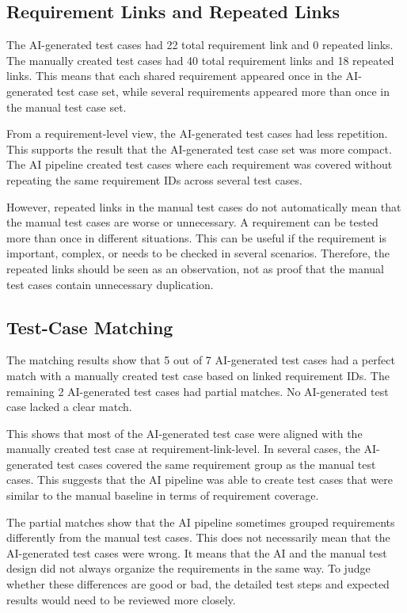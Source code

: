 \documentclass[a4paper,12pt]{article}
\begin{document}
\subsection{Requirement Links and Repeated Links}
The AI-generated test cases had 22 total requirement link and 0 repeated links. The manually created test cases had 40 total requirement links and 18 repeated links. This means that each shared requirement appeared once in the AI-generated test case set, while several requirements appeared more than once in the manual test case set.

From a requirement-level view, the AI-generated test cases had less repetition. This supports the result that the AI-generated test case set was more compact. The AI pipeline created test cases where each requirement was covered without repeating the same requirement IDs across several test cases. 

However, repeated links in the manual test cases do not automatically mean that the manual test cases are worse or unnecessary. A requirement can be tested more than once in different situations. This can be useful if the requirement is important, complex, or needs to be checked in several scenarios. Therefore, the repeated links should be seen as an observation, not as proof that the manual test cases contain unnecessary duplication.

\subsection{Test-Case Matching}
The matching results show that 5 out of 7 AI-generated test cases had a perfect match with a manually created test case based on linked requirement IDs. The remaining 2 AI-generated test cases had partial matches. No AI-generated test case lacked a clear match.

This shows that most of the AI-generated test case were aligned with the manually created test case at requirement-link-level. In several cases, the AI-generated test cases covered the same requirement group as the manual test cases. This suggests that the AI pipeline was able to create test cases that were similar to the manual baseline in terms of requirement coverage.

The partial matches show that the AI pipeline sometimes grouped requirements differently from the manual test cases. This does not necessarily mean that the AI-generated test cases were wrong. It means that the AI and the manual test design did not always organize the requirements in the same way. To judge whether these differences are good or bad, the detailed test steps and expected results would need to be reviewed more closely.
\end{document}
